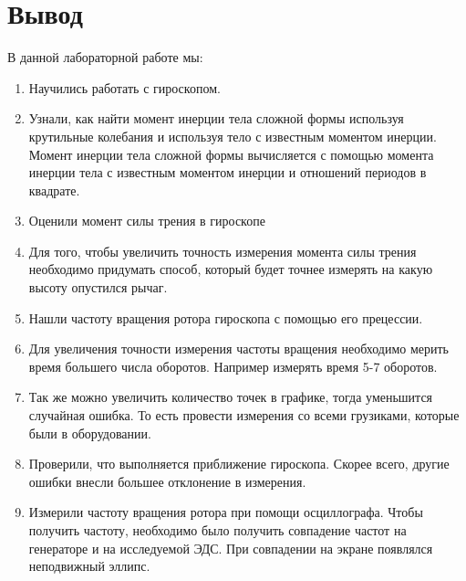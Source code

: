\documentclass[a4paper,12pt]{article}
\begin{document}
\section{Вывод}
В данной лабораторной работе мы: \par
\begin{enumerate}
    \item Научились работать с гироскопом.
    \item Узнали, как найти момент инерции тела сложной формы используя крутильные колебания и используя тело с известным моментом инерции. Момент инерции тела сложной формы вычисляется с помощью момента инерции тела с известным моментом инерции и отношений периодов в квадрате.
    \item Оценили момент силы трения в гироскопе
    \item Для того, чтобы увеличить точность измерения момента силы трения необходимо придумать способ, который будет точнее измерять на какую высоту опустился рычаг.
    \item Нашли частоту вращения ротора гироскопа с помощью его прецессии. 
    \item Для увеличения точности измерения частоты вращения необходимо мерить время большего числа оборотов. Например измерять время 5-7 оборотов. 
    \item Так же можно увеличить количество точек в графике, тогда уменьшится случайная ошибка. То есть провести измерения со всеми грузиками, которые были в оборудовании. 
    \item Проверили, что выполняется приближение гироскопа. Скорее всего, другие ошибки внесли большее отклонение в измерения.
    \item Измерили частоту вращения ротора при помощи осциллографа. Чтобы получить частоту, необходимо было получить совпадение частот на генераторе и на исследуемой ЭДС. При совпадении на экране появлялся неподвижный эллипс.
    
\end{enumerate}
\end{document}
